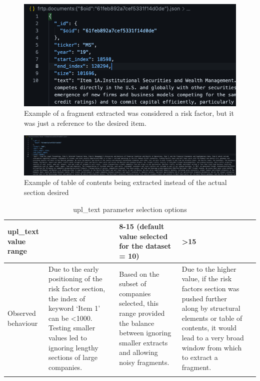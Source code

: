 \documentclass[12pt,MSc,a4paper,oneside]{muthesis}
\begin{document}
\label{appendix:5}
\begin{figure}[h]
    \centering
    \includegraphics[scale=0.5]{images/fragment extracted.png}
    \caption{Example of a fragment extracted was considered a risk factor, but it was just a reference to the desired item.}
\end{figure}

\label{appendix:6}
\begin{figure}[h]
    \centering
    \includegraphics[scale=0.10]{images/example.png}
    \caption{Example of table of contents being extracted instead of the actual section desired}
\end{figure}

\label{appendix:7}
\begin{table}
  
  \label{tab:freq}
  \begin{tabularx}{\textwidth}{|L|X|X|X|L|}
    \toprule
    upl\_text value range &  & 8-15 (default value selected for the dataset = 10) & \textgreater 15\\
    \midrule
    Observed behaviour & Due to the early positioning of the risk factor section, the index of keyword ‘Item 1' can be \textless 1000. Testing smaller values led to ignoring lengthy sections of large companies. & Based on the subset of companies selected, this range provided the balance between ignoring smaller extracts and allowing noisy fragments. & Due to the higher value, if the risk factors section was pushed further along by structural elements or table of contents, it would lead to a very broad window from which to extract a fragment.\\
    \bottomrule
    \caption{upl\_text parameter selection options}
\end{tabularx}
\end{table}
\end{document}
